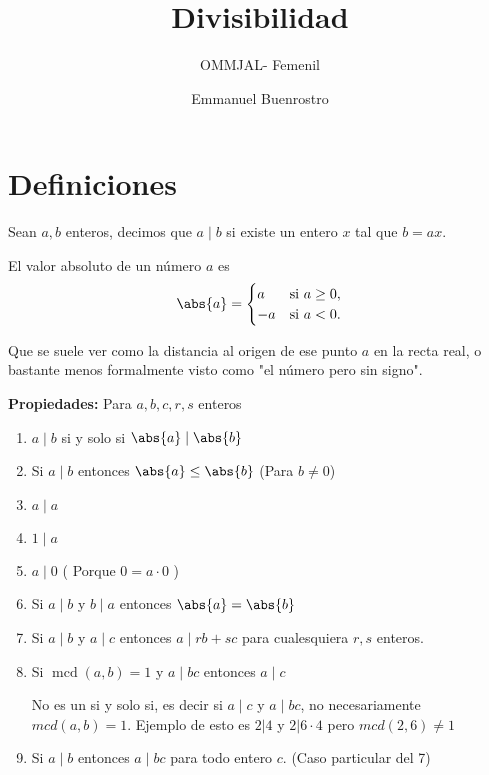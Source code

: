 \documentclass[11pt]{scrartcl}
\title {Divisibilidad}
\subtitle{OMMJAL- Femenil}
\author{Emmanuel Buenrostro}
\newcommand{\mcd}{\operatorname{mcd}}
\begin{document}
\maketitle


\section{Definiciones}
\begin{definition} [Divisibilidad]
    Sean $a,b$ enteros, decimos que $a \mid b $ si existe un entero $x$ tal que $b=ax$.
\end{definition}


\begin{definition}
El valor absoluto de un número $a$ es
\[
\abs{a} =
\begin{cases}
  a & \text{si } a \geq 0, \\
  -a & \text{si } a < 0.
\end{cases}
\]

Que se suele ver como la distancia al origen de ese punto $a$ en la recta real, o bastante menos formalmente visto como "el número pero sin signo". 	
\end{definition}


\textbf{Propiedades:} Para $a,b,c, r, s$ enteros
\begin{enumerate}
    \item $a\mid b$ si y solo si $\abs{a} \mid \abs{b}$
    \item Si $a \mid b$ entonces $\abs{a} \leq \abs{b} $ (Para $b\neq 0$)
    \item $a \mid a$
    \item $1 \mid a$ 
    \item $a \mid 0$ ( Porque $0=a\cdot 0$ )
    \item Si $a \mid b$ y $b \mid a$ entonces $\abs{a}=\abs{b}$
    \item Si $a \mid b$ y $a \mid c$ entonces $a \mid rb+sc$ para cualesquiera $r,s$ enteros.
    \item Si $\mcd(a, b)=1$ y $a \mid bc$ entonces $a \mid c$ 
    \begin{remark} [No es si y solo si]
    No es un si y solo si, es decir si $a \mid c$ y $a \mid bc$, no necesariamente $mcd(a,b)=1$. Ejemplo de esto es $2 | 4 $ y $2 | 6\cdot 4$ pero $mcd(2,6)\neq 1$
    \end{remark}
    \item Si $a\mid b$ entonces $a\mid bc$ para todo entero $c$. (Caso particular del 7)
\end{enumerate}
\end{document}
